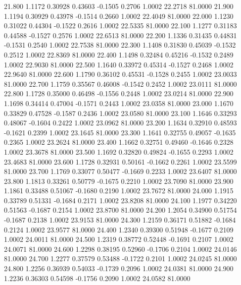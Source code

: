   21.800   1.1172   0.30928   0.43603  -0.1505   0.2706   1.0002  22.2718  81.0000
  21.900   1.1194   0.30929   0.43978  -0.1514   0.2660   1.0002  22.4049  81.0000
  22.000   1.1230   0.31022   0.44304  -0.1522   0.2616   1.0002  22.5335  81.0000
  22.100   1.1277   0.31183   0.44588  -0.1527   0.2576   1.0002  22.6513  81.0000
  22.200   1.1336   0.31435   0.44831  -0.1531   0.2540   1.0002  22.7538  81.0000
  22.300   1.1408   0.31830   0.45039  -0.1532   0.2512   1.0002  22.8369  81.0000
  22.400   1.1498   0.32484   0.45216  -0.1532   0.2489   1.0002  22.9030  81.0000
  22.500   1.1640   0.33972   0.45314  -0.1527   0.2468   1.0002  22.9640  81.0000
  22.600   1.1790   0.36102   0.45531  -0.1528   0.2455   1.0002  23.0033  81.0000
  22.700   1.1759   0.35567   0.46008  -0.1542   0.2452   1.0002  23.0111  81.0000
  22.800   1.1728   0.35000   0.46498  -0.1556   0.2448   1.0002  23.0214  81.0000
  22.900   1.1698   0.34414   0.47004  -0.1571   0.2443   1.0002  23.0358  81.0000
  23.000   1.1670   0.33829   0.47528  -0.1587   0.2436   1.0002  23.0580  81.0000
  23.100   1.1646   0.33293   0.48067  -0.1604   0.2422   1.0002  23.0962  81.0000
  23.200   1.1634   0.32910   0.48593  -0.1621   0.2399   1.0002  23.1645  81.0000
  23.300   1.1641   0.32755   0.49057  -0.1635   0.2365   1.0002  23.2624  81.0000
  23.400   1.1662   0.32751   0.49460  -0.1646   0.2328   1.0002  23.3678  81.0000
  23.500   1.1692   0.32820   0.49824  -0.1655   0.2293   1.0002  23.4683  81.0000
  23.600   1.1728   0.32931   0.50161  -0.1662   0.2261   1.0002  23.5599  81.0000
  23.700   1.1769   0.33077   0.50477  -0.1669   0.2233   1.0002  23.6407  81.0000
  23.800   1.1813   0.33261   0.50779  -0.1675   0.2210   1.0002  23.7090  81.0000
  23.900   1.1861   0.33488   0.51067  -0.1680   0.2190   1.0002  23.7672  81.0000
  24.000   1.1915   0.33789   0.51331  -0.1684   0.2171   1.0002  23.8208  81.0000
  24.100   1.1977   0.34220   0.51563  -0.1687   0.2154   1.0002  23.8700  81.0000
  24.200   1.2054   0.34900   0.51754  -0.1687   0.2138   1.0002  23.9153  81.0000
  24.300   1.2159   0.36171   0.51882  -0.1684   0.2124   1.0002  23.9577  81.0000
  24.400   1.2340   0.39300   0.51948  -0.1677   0.2109   1.0002  24.0011  81.0000
  24.500   1.2319   0.38772   0.52448  -0.1691   0.2107   1.0002  24.0071  81.0000
  24.600   1.2298   0.38195   0.52960  -0.1706   0.2104   1.0002  24.0146  81.0000
  24.700   1.2277   0.37579   0.53488  -0.1722   0.2101   1.0002  24.0245  81.0000
  24.800   1.2256   0.36939   0.54033  -0.1739   0.2096   1.0002  24.0381  81.0000
  24.900   1.2236   0.36303   0.54598  -0.1756   0.2090   1.0002  24.0582  81.0000
